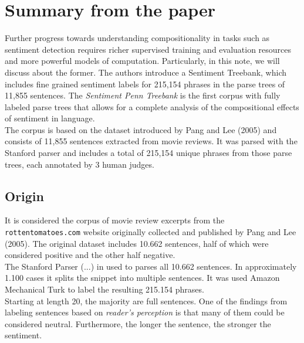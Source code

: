 \section{Summary from the paper}

Further progress towards understanding compositionality in tasks such as
sentiment detection requires richer supervised training and evaluation resources
and more powerful models of computation. Particularly, in this note, we will
discuss about the former. The authors introduce a Sentiment Treebank, which
includes fine grained sentiment labels for 215,154 phrases in the parse trees of
11,855 sentences. The \textit{Sentiment Penn Treebank} is the first corpus with
fully labeled parse trees that allows for a complete analysis of the
compositional effects of sentiment in language.\\ 
The corpus is based on the dataset introduced by Pang and Lee (2005) and
consists of 11,855 sentences extracted from movie reviews. It was parsed with
the Stanford parser and includes a total of 215,154 unique phrases from those
parse trees, each annotated by 3 human judges.

\subsection{Origin}

It is considered the corpus of movie review excerpts from the
\texttt{rottentomatoes.com} website originally collected and published by Pang
and Lee (2005).
The original dataset includes 10.662 sentences, half of which were considered
positive and the other half negative.\\
The Stanford Parser (...) in used to parses all 10.662 sentences. In
approximately 1.100 cases it splits the snippet into multiple sentences. It was
used Amazon Mechanical Turk to label the resulting 215.154 phrases.\\
Starting at length 20, the majority are full sentences. One of the findings from
labeling sentences based on \textit{reader's perception} is that many of them
could be considered neutral. Furthermore, the longer the sentence, the 
stronger the sentiment.
